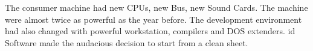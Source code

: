 The consumer machine had new CPUs, new Bus, new Sound Cards. The machine were almost twice as powerful as the year before. The development environment had also changed with powerful workstation, compilers and DOS extenders. id Software made the audacious decision to start from a clean sheet.\\
\par





